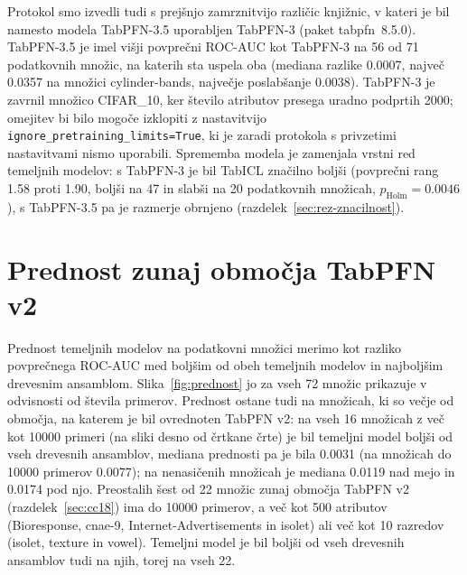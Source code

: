 \documentclass[a4paper,12pt,openright]{book}
\begin{document}
Protokol smo izvedli tudi s prejšnjo zamrznitvijo različic knjižnic, v kateri je
bil namesto modela TabPFN-3.5 uporabljen TabPFN-3 (paket tabpfn~8.5.0).
TabPFN-3.5 je imel višji povprečni ROC-AUC kot TabPFN-3 na 56 od 71 podatkovnih
množic, na katerih sta uspela oba (mediana razlike \num{0.0007}, največ
\num{0.0357} na množici cylinder-bands, največje poslabšanje \num{0.0038}).
TabPFN-3 je zavrnil množico CIFAR\_10, ker število atributov presega uradno
podprtih 2000; omejitev bi bilo mogoče izklopiti z nastavitvijo
\texttt{ignore\_pretraining\_limits=True}, ki je zaradi protokola s privzetimi
nastavitvami nismo uporabili. Sprememba modela je zamenjala vrstni red
temeljnih modelov: s TabPFN-3 je bil TabICL značilno boljši (povprečni rang
\num{1.58} proti \num{1.90}, boljši na 47 in slabši na 20 podatkovnih
množicah, $p_\mathrm{Holm} = \num{0.0046}$), s TabPFN-3.5 pa je razmerje
obrnjeno (razdelek~\ref{sec:rez-znacilnost}).

\section{Prednost zunaj območja TabPFN v2}
\label{sec:rez-lastnosti}

Prednost temeljnih modelov na podatkovni množici merimo kot razliko
povprečnega ROC-AUC med boljšim od obeh temeljnih modelov in najboljšim
drevesnim ansamblom. Slika~\ref{fig:prednost} jo za vseh 72 množic prikazuje v
odvisnosti od števila primerov. Prednost ostane tudi na množicah, ki so večje
od območja, na katerem je bil ovrednoten TabPFN v2: na vseh 16 množicah z več
kot \num{10000} primeri (na sliki desno od črtkane črte) je bil temeljni model
boljši od vseh drevesnih ansamblov, mediana prednosti pa je bila \num{0.0031}
(na množicah do \num{10000} primerov \num{0.0077}); na nenasičenih množicah je
mediana \num{0.0119} nad mejo in \num{0.0174} pod njo. Preostalih šest od 22
množic zunaj območja TabPFN v2 (razdelek~\ref{sec:cc18}) ima do \num{10000}
primerov, a več kot 500 atributov (Bioresponse, cnae-9, Internet-Advertisements
in isolet) ali več kot 10 razredov (isolet, texture in vowel). Temeljni model je
bil boljši od vseh drevesnih ansamblov tudi na njih, torej na vseh 22.
\end{document}
